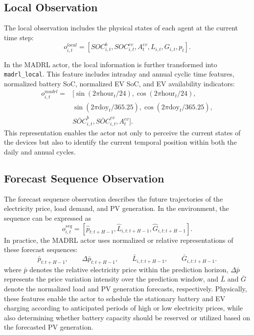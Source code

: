 \subsection{Local Observation}

The local observation includes the physical states of each agent at the current time step:
\[
  o^{local}_{i,t}
  =
  [SOC^b_{i,t},SOC^{ev}_{i,t},A^{ev}_t,L_{i,t},G_{i,t},p_t].
\]

In the MADRL actor, the local information is further transformed into \texttt{madrl\_local}. This feature includes intraday and annual cyclic time features, normalized battery SoC, normalized EV SoC, and EV availability indicators:
\[
\begin{aligned}
o^{madrl}_{i,t}
={}&[
\sin(2\pi \mathrm{hour}_t/24),
\cos(2\pi \mathrm{hour}_t/24),\\
&\sin(2\pi \mathrm{doy}_t/365.25),
\cos(2\pi \mathrm{doy}_t/365.25),\\
&\bar{SOC}^b_{i,t},
\bar{SOC}^{ev}_{i,t},
A^{ev}_t].
\end{aligned}
\]
This representation enables the actor not only to perceive the current states of the devices but also to identify the current temporal position within both the daily and annual cycles.

\subsection{Forecast Sequence Observation}

The forecast sequence observation describes the future trajectories of the electricity price, load demand, and PV generation. In the environment, the sequence can be expressed as
\[
  o^{seq}_{i,t}
  =
  [\hat p_{t:t+H-1},\hat L_{i,t:t+H-1},\hat G_{i,t:t+H-1}].
\]
In practice, the MADRL actor uses normalized or relative representations of these forecast sequences:
\[
  \bar p_{t:t+H-1},\qquad
  \Delta \bar p_{t:t+H-1},\qquad
  \bar L_{i,t:t+H-1},\qquad
  \bar G_{i,t:t+H-1}.
\]
where \(\bar p\) denotes the relative electricity price within the prediction horizon, \(\Delta \bar p\) represents the price variation intensity over the prediction window, and \(\bar L\) and \(\bar G\) denote the normalized load and PV generation forecasts, respectively. Physically, these features enable the actor to schedule the stationary battery and EV charging according to anticipated periods of high or low electricity prices, while also determining whether battery capacity should be reserved or utilized based on the forecasted PV generation.

